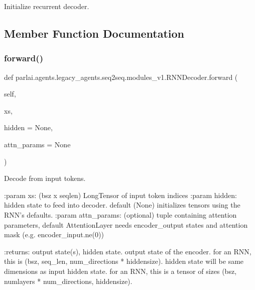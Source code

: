 \begin{DoxyVerb}Initialize recurrent decoder.
\end{DoxyVerb}
 

\subsection{Member Function Documentation}
\mbox{\label{classparlai_1_1agents_1_1legacy__agents_1_1seq2seq_1_1modules__v1_1_1RNNDecoder_aa0fdddaf98d3385b432a9b52a0d1adbb}} 
\subsubsection{\texorpdfstring{forward()}{forward()}}
{\footnotesize\ttfamily def parlai.\+agents.\+legacy\+\_\+agents.\+seq2seq.\+modules\+\_\+v1.\+R\+N\+N\+Decoder.\+forward (\begin{DoxyParamCaption}\item[{}]{self,  }\item[{}]{xs,  }\item[{}]{hidden = {\ttfamily None},  }\item[{}]{attn\+\_\+params = {\ttfamily None} }\end{DoxyParamCaption})}

\begin{DoxyVerb}Decode from input tokens.

:param xs:          (bsz x seqlen) LongTensor of input token indices
:param hidden:      hidden state to feed into decoder. default (None)
            initializes tensors using the RNN's defaults.
:param attn_params: (optional) tuple containing attention parameters,
            default AttentionLayer needs encoder_output states
            and attention mask (e.g. encoder_input.ne(0))

:returns:           output state(s), hidden state.
            output state of the encoder. for an RNN, this is
            (bsz, seq_len, num_directions * hiddensize).
            hidden state will be same dimensions as input
            hidden state. for an RNN, this is a tensor of sizes
            (bsz, numlayers * num_directions, hiddensize).
\end{DoxyVerb}
 

